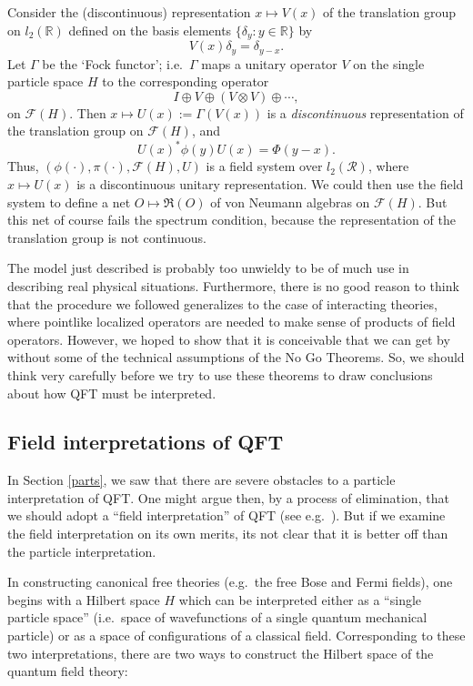 \documentclass[11pt]{article}
\theoremstyle{definition}
\theoremstyle{definition}
\theoremstyle{remark}
\def\2#1{{\mathcal #1}}
\def\al#1{{\mathfrak #1}}
\begin{document}
Consider the (discontinuous) representation $x\mapsto
V(x)$ of the translation group on $l_2(\mathbb{R})$
defined on the basis elements $\{ \delta _y:y\in
\mathbb{R}\}$ by
\begin{equation}
  V(x)\delta _{y} =\delta _{y-x} .\end{equation}
Let $\Gamma$ be the `Fock functor'; i.e.\ $\Gamma$ maps
a unitary operator $V$ on the single particle
space $H$ to the corresponding operator 
\[ I\oplus V\oplus (V\otimes V)\oplus \cdots , \] on
$\2F (H)$.  Then $x\mapsto U(x):=\Gamma (V(x))$ is a
\emph{discontinuous} representation of the translation
group on $\2F (H)$, and
\begin{equation}
  U(x)^*\phi (y)U(x)=\Phi (y-x) .\end{equation}
Thus, $(\phi (\cdot ),\pi (\cdot ),\2F (H),U)$ is a
field system over $l_2(\2R )$,
where $x\mapsto U(x)$ is a discontinuous unitary representation.  We could then use
the field system to define a net $O\mapsto \al R(O)$ of von Neumann algebras on $\2F
(H)$.  But this net of course fails the spectrum condition, because the
representation of the translation group is not continuous.    

The model just described is probably too unwieldy to be
of much use in describing real physical situations.
Furthermore, there is no good reason to think that the
procedure we followed generalizes to the case of
interacting theories, where pointlike localized
operators are needed to make sense of products of field
operators.  However, we hoped to show that it is
conceivable that we can get by without some of the
technical assumptions of the No Go Theorems.  So, we
should think very carefully before we try to use these
theorems to draw conclusions about how QFT must be
interpreted.




\subsection{Field interpretations of QFT}

In Section \ref{parts}, we saw that there are severe obstacles to a
particle interpretation of QFT.  One might argue then, by a process of
elimination, that we should adopt a ``field interpretation'' of QFT
(see e.g.\ \cite{tell,nhug}).  But if we examine the field
interpretation on its own merits, its not clear that it is better off
than the particle interpretation.  

In constructing canonical free theories (e.g.\ the free Bose and Fermi
fields), one begins with a Hilbert space $H$ which can be interpreted
either as a ``single particle space'' (i.e.\ space of wavefunctions of
a single quantum mechanical particle) or as a space of configurations
of a classical field.  Corresponding to these two interpretations,
there are two ways to construct the Hilbert space of the quantum field
theory:
\end{document}
